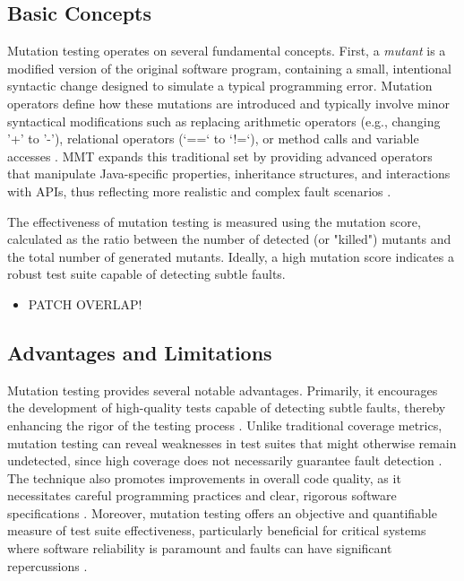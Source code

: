 \documentclass[sigplan, nonacm]{acmart}
\begin{document}
\subsection{Basic Concepts}
Mutation testing operates on several fundamental concepts. First, a \textit{mutant} is a modified version of the original software program, containing a small, intentional syntactic change designed to simulate a typical programming error. Mutation operators define how these mutations are introduced and typically involve minor syntactical modifications such as replacing arithmetic operators (e.g., changing '+' to '-'), relational operators (`==` to `!=`), or method calls and variable accesses \cite{offutt_mutation_2001}. MMT expands this traditional set by providing advanced operators that manipulate Java-specific properties, inheritance structures, and interactions with APIs, thus reflecting more realistic and complex fault scenarios \cite{bockisch_mmt_2024}.

The effectiveness of mutation testing is measured using the mutation score, calculated as the ratio between the number of detected (or "killed") mutants and the total number of generated mutants. Ideally, a high mutation score indicates a robust test suite capable of detecting subtle faults.

\begin{itemize}
    \item PATCH OVERLAP!
\end{itemize}

\subsection{Advantages and Limitations}

Mutation testing provides several notable advantages. Primarily, it encourages the development of high-quality tests capable of detecting subtle faults, thereby enhancing the rigor of the testing process \cite{jia_analysis_2011}. Unlike traditional coverage metrics, mutation testing can reveal weaknesses in test suites that might otherwise remain undetected, since high coverage does not necessarily guarantee fault detection \cite{jia_analysis_2011,bockisch_mmt_2024}. The technique also promotes improvements in overall code quality, as it necessitates careful programming practices and clear, rigorous software specifications \cite{offutt_mutation_2001}. Moreover, mutation testing offers an objective and quantifiable measure of test suite effectiveness, particularly beneficial for critical systems where software reliability is paramount and faults can have significant repercussions \cite{offutt_mutation_2001,jia_analysis_2011}.
\end{document}
